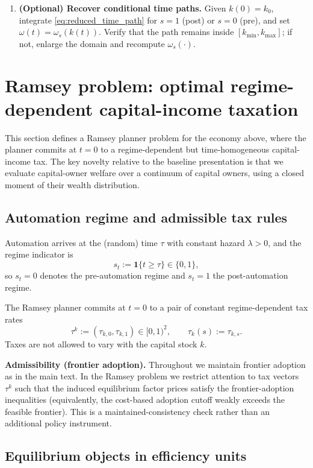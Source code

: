 \documentclass{article}
\begin{document}
\begin{enumerate}
\item \textbf{(Optional) Recover conditional time paths.}
Given $k(0)=k_0$, integrate \eqref{eq:reduced_time_path} for $s=1$ (post) or $s=0$ (pre),
and set $\omega(t)=\omega_s(k(t))$. Verify that the path remains inside $[k_{\min},k_{\max}]$;
if not, enlarge the domain and recompute $\omega_s(\cdot)$.
\end{enumerate}


\section{Ramsey problem: optimal regime-dependent capital-income taxation}

This section defines a Ramsey planner problem for the economy above, where the planner commits at $t=0$
to a regime-dependent but time-homogeneous capital-income tax. The key novelty relative to the baseline
presentation is that we evaluate capital-owner welfare over a continuum of capital owners, using a closed
moment of their wealth distribution.

\subsection{Automation regime and admissible tax rules}

Automation arrives at the (random) time $\tau$ with constant hazard $\lambda>0$, and the regime indicator is
\[
s_t := \mathbf{1}\{t\ge \tau\}\in\{0,1\},
\]
so $s_t=0$ denotes the pre-automation regime and $s_t=1$ the post-automation regime.

The Ramsey planner commits at $t=0$ to a pair of constant regime-dependent tax rates
\[
\tau^k := (\tau_{k,0},\tau_{k,1})\in[0,1)^2,
\qquad
\tau_k(s) := \tau_{k,s}.
\]
Taxes are not allowed to vary with the capital stock $k$.

\medskip
\noindent
\textbf{Admissibility (frontier adoption).}
Throughout we maintain frontier adoption as in the main text. In the Ramsey problem we restrict attention to
tax vectors $\tau^k$ such that the induced equilibrium factor prices satisfy the frontier-adoption inequalities
(equivalently, the cost-based adoption cutoff weakly exceeds the feasible frontier). This is a maintained-consistency
check rather than an additional policy instrument.

\subsection{Equilibrium objects in efficiency units}
\end{document}
